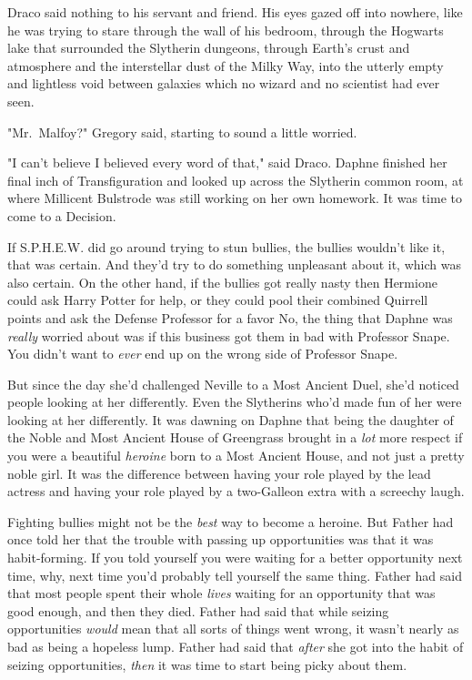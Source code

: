 Draco said nothing to his servant and friend. His eyes gazed off into nowhere,
like he was trying to stare through the wall of his bedroom, through the
Hogwarts lake that surrounded the Slytherin dungeons, through Earth's crust and
atmosphere and the interstellar dust of the Milky Way, into the utterly empty
and lightless void between galaxies which no wizard and no scientist had ever
seen.

"Mr.~Malfoy?" Gregory said, starting to sound a little worried.

"I can't believe I believed every word of that," said Draco.
\sbreak
Daphne finished her final inch of Transfiguration and looked up across the
Slytherin common room, at where Millicent Bulstrode was still working on her
own homework. It was time to come to a Decision.

If S.P.H.E.W. did go around trying to stun bullies, the bullies wouldn't like
it, that was certain. And they'd try to do something unpleasant about it, which
was also certain. On the other hand, if the bullies got really nasty then
Hermione could ask Harry Potter for help, or they could pool their combined
Quirrell points and ask the Defense Professor for a favor{\el} No, the thing
that Daphne was \emph{really} worried about was if this business got them in
bad with Professor Snape. You didn't want to \emph{ever} end up on the wrong
side of Professor Snape.

But since the day she'd challenged Neville to a Most Ancient Duel, she'd
noticed people looking at her differently. Even the Slytherins who'd made fun
of her were looking at her differently. It was dawning on Daphne that being the
daughter of the Noble and Most Ancient House of Greengrass brought in a
\emph{lot} more respect if you were a beautiful \emph{heroine} born to a Most
Ancient House, and not just a pretty noble girl. It was the difference between
having your role played by the lead actress and having your role played by a
two-Galleon extra with a screechy laugh.

Fighting bullies might not be the \emph{best} way to become a heroine. But
Father had once told her that the trouble with passing up opportunities was
that it was habit-forming. If you told yourself you were waiting for a better
opportunity next time, why, next time you'd probably tell yourself the same
thing. Father had said that most people spent their whole \emph{lives} waiting
for an opportunity that was good enough, and then they died. Father had said
that while seizing opportunities \emph{would} mean that all sorts of things
went wrong, it wasn't nearly as bad as being a hopeless lump. Father had said
that \emph{after} she got into the habit of seizing opportunities, \emph{then}
it was time to start being picky about them.

